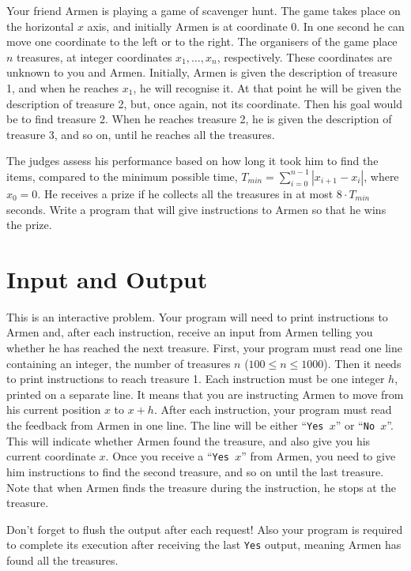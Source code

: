 
Your friend Armen is playing a game of scavenger hunt.
The game takes place on the horizontal $x$ axis, and initially Armen is at coordinate $0$.
In one second he can move one coordinate to the left or to the right.
The organisers of the game place $n$ treasures, at integer coordinates $x_1,\dots, x_n$, respectively.
These coordinates are unknown to you and Armen.
Initially, Armen is given the description of treasure 1, and when he reaches $x_1$, he will recognise it.
At that point he will be given the description of treasure 2, but, once again, not its coordinate.
Then his goal would be to find treasure 2.
When he reaches treasure 2, he is given the description of treasure 3, and so on, until he reaches all the treasures.

The judges assess his performance based on how long it took him to find the items, compared to the minimum possible time, $T_{min} = \sum_{i = 0}^{n-1}|x_{i + 1} - x_i|$, where $x_0 = 0$.
He receives a prize if he collects all the treasures in at most $8 \cdot T_{min}$ seconds.
Write a program that will give instructions to Armen so that he wins the prize.

\section*{Input and Output}
This is an interactive problem.
Your program will need to print instructions to Armen and, after each instruction, receive an input from Armen telling you whether he has reached the next treasure.
First, your program must read one line containing an integer, the number of treasures $n$ ($100 \leq n \leq 1000$).
Then it needs to print instructions to reach treasure 1.
Each instruction must be one integer $h$, printed on a separate line.
It means that you are instructing Armen to move from his current position $x$ to $x + h$.
After each instruction, your program must read the feedback from Armen in one line.
The line will be either ``\texttt{Yes }$x$'' or ``\texttt{No }$x$''.
This will indicate whether Armen found the treasure, and also give you his current coordinate $x$.
Once you receive a ``\texttt{Yes }$x$'' from Armen, you need to give him instructions to find the second treasure, and so on until the last treasure.
Note that when Armen finds the treasure during the instruction, he stops at the treasure.

Don’t forget to flush the output after each request!
Also your program is required to complete its execution after receiving the last \texttt{Yes} output, meaning Armen has found all the treasures.

